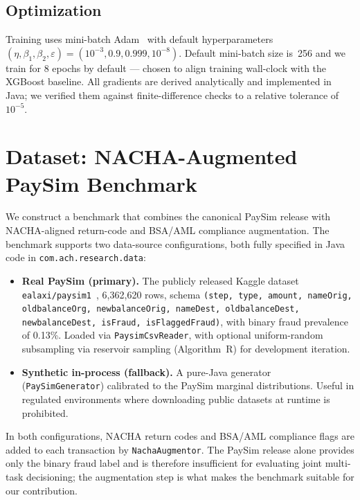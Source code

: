 \documentclass[11pt,a4paper]{article}
\begin{document}
\subsection{Optimization}
Training uses mini-batch Adam~\cite{kingma2015} with default
hyperparameters $(\eta, \beta_1, \beta_2, \varepsilon) =
(10^{-3}, 0.9, 0.999, 10^{-8})$. Default mini-batch size is~256 and we
train for 8 epochs by default --- chosen to align training wall-clock with
the XGBoost baseline. All gradients are derived analytically and
implemented in Java; we verified them against finite-difference checks
to a relative tolerance of $10^{-5}$.

\section{Dataset: NACHA-Augmented PaySim Benchmark}
\label{sec:dataset}

We construct a benchmark that combines the canonical PaySim release with
NACHA-aligned return-code and BSA/AML compliance augmentation. The
benchmark supports two data-source configurations, both fully specified
in Java code in
\texttt{com.ach.research.data}:

\begin{itemize}
    \item \textbf{Real PaySim (primary).} The publicly released Kaggle
    dataset \texttt{ealaxi/paysim1}~\cite{lopez2016}, 6{,}362{,}620 rows,
    schema
    \texttt{(step, type, amount, nameOrig, oldbalanceOrg, newbalanceOrig,
    nameDest, oldbalanceDest, newbalanceDest, isFraud, isFlaggedFraud)},
    with binary fraud prevalence of 0.13\%. Loaded via
    \texttt{PaysimCsvReader}, with optional uniform-random subsampling
    via reservoir sampling (Algorithm~R) for development iteration.
    \item \textbf{Synthetic in-process (fallback).} A pure-Java generator
    (\texttt{PaySimGenerator}) calibrated to the PaySim marginal
    distributions. Useful in regulated environments where downloading
    public datasets at runtime is prohibited.
\end{itemize}

In both configurations, NACHA return codes and BSA/AML compliance flags
are added to each transaction by \texttt{NachaAugmentor}. The PaySim
release alone provides only the binary fraud label and is therefore
insufficient for evaluating joint multi-task decisioning; the
augmentation step is what makes the benchmark suitable for our
contribution.
\end{document}
